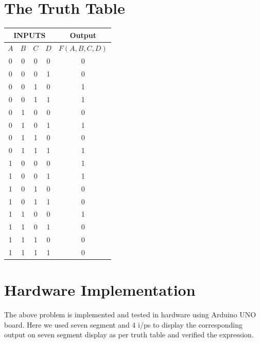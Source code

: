 \documentclass[a4paper,12pt]{article}
\begin{document}
\section*{\textbf{The Truth Table}}
\begin{center}
\begin{tabular}{|c|c|c|c|c|}
\hline
	\multicolumn{4}{|c|}{\textbf{INPUTS}} & \textbf{Output} \\ 
\hline
	$A$ & $B$ & $C$ & $D$ & $F(A,B,C,D)$ \\
\hline
0 & 0 & 0 & 0 & 0 \\ 
0 & 0 & 0 & 1 & 0 \\ 
0 & 0 & 1 & 0 & 1 \\ 
0 & 0 & 1 & 1 & 1 \\ 
0 & 1 & 0 & 0 & 0 \\ 
0 & 1 & 0 & 1 & 1 \\ 
0 & 1 & 1 & 0 & 0 \\ 
0 & 1 & 1 & 1 & 1 \\ 
1 & 0 & 0 & 0 & 1 \\ 
1 & 0 & 0 & 1 & 1 \\ 
1 & 0 & 1 & 0 & 0 \\ 
1 & 0 & 1 & 1 & 0 \\ 
1 & 1 & 0 & 0 & 1 \\ 
1 & 1 & 0 & 1 & 0 \\ 
1 & 1 & 1 & 0 & 0 \\ 
1 & 1 & 1 & 1 & 0 \\ 
\hline
\end{tabular}
\end{center}
\section*{\textbf{Hardware Implementation}}
The above problem is implemented and tested in hardware using Arduino UNO board. Here we used seven segment and 4 i/ps to display the corresponding output on seven segment display as per truth table and verified the expression.
\end{document}
